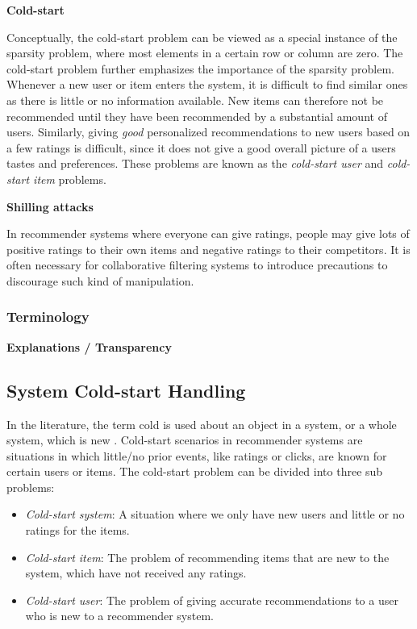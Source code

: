 \textbf{Cold-start}

Conceptually, the cold-start problem can be viewed as a special instance of the sparsity problem, where most elements in a certain row or column are zero. The cold-start problem further emphasizes the importance of the sparsity problem. Whenever a new user or item enters the system, it is difficult to find similar ones as there is little or no information available. New items can therefore not be recommended until they have been recommended by a substantial amount of users. Similarly, giving \emph{good} personalized recommendations to new users based on a few ratings is difficult, since it does not give a good overall picture of a users tastes and preferences. These problems are known as the \emph{cold-start user} and \emph{cold-start item} problems.

\textbf{Shilling attacks}

In recommender systems where everyone can give ratings, people may give lots of positive ratings to their own items and negative ratings to their competitors. It is often necessary for collaborative filtering systems to introduce precautions to discourage such kind of manipulation.

\subsubsection{Terminology}

\textbf{Explanations / Transparency}


\subsection{System Cold-start Handling}


In the literature, the term cold is used about an object in a system, or a
whole system, which is new \cite{Schein2002, Park2006}. Cold-start scenarios in recommender systems are
situations in which little/no prior events, like ratings or clicks, are known
for certain users or items. The cold-start problem can be divided into three sub problems:

\begin{itemize}
  \item \emph{Cold-start system}: A situation where we only have new users and
  little or no ratings for the items.

  \item \emph{Cold-start item}: The problem of recommending items that are new
  to the system, which have not received any ratings. 

  \item \emph{Cold-start user}: The problem of giving accurate recommendations
  to a user who is new to a recommender system.
\end{itemize}

